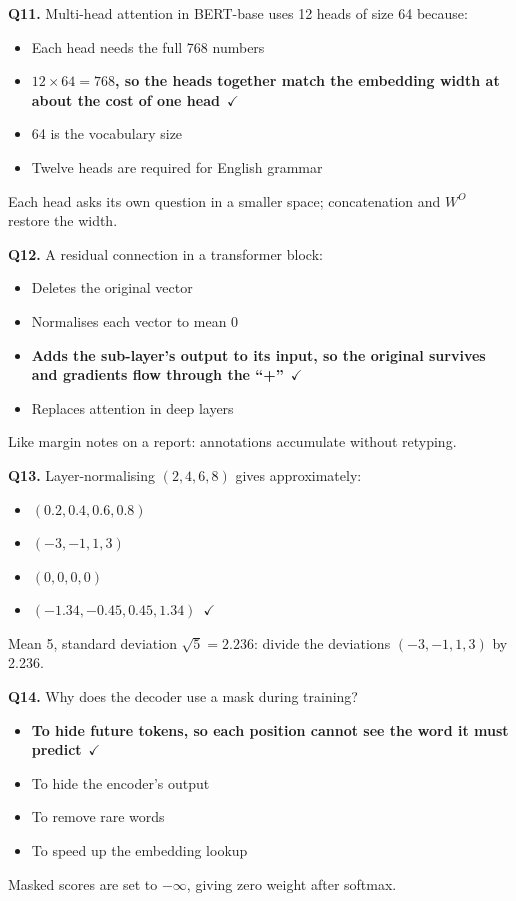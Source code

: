 \documentclass[11pt]{article}
\begin{document}
{\noindent\textbf{Q11.} Multi-head attention in BERT-base uses 12 heads of size 64 because:\begin{itemize}[leftmargin=2.2em,itemsep=0pt,topsep=1pt]\item[A.] Each head needs the full 768 numbers\item[\textbf{B.}] \textbf{$12\times64=768$, so the heads together match the embedding width at about the cost of one head}~{\color{GrnN}$\checkmark$}\item[C.] 64 is the vocabulary size\item[D.] Twelve heads are required for English grammar\end{itemize} Each head asks its own question in a smaller space; concatenation and $W^O$ restore the width.\par\medskip

\noindent\textbf{Q12.} A residual connection in a transformer block:\begin{itemize}[leftmargin=2.2em,itemsep=0pt,topsep=1pt]\item[A.] Deletes the original vector\item[B.] Normalises each vector to mean 0\item[\textbf{C.}] \textbf{Adds the sub-layer's output to its input, so the original survives and gradients flow through the ``+''}~{\color{GrnN}$\checkmark$}\item[D.] Replaces attention in deep layers\end{itemize} Like margin notes on a report: annotations accumulate without retyping.\par\medskip

\noindent\textbf{Q13.} Layer-normalising $(2,4,6,8)$ gives approximately:\begin{itemize}[leftmargin=2.2em,itemsep=0pt,topsep=1pt]\item[A.] $(0.2,0.4,0.6,0.8)$\item[B.] $(-3,-1,1,3)$\item[C.] $(0,0,0,0)$\item[\textbf{D.}] \textbf{$(-1.34,-0.45,0.45,1.34)$}~{\color{GrnN}$\checkmark$}\end{itemize} Mean 5, standard deviation $\sqrt5=2.236$: divide the deviations $(-3,-1,1,3)$ by 2.236.\par\medskip

\noindent\textbf{Q14.} Why does the decoder use a mask during training?\begin{itemize}[leftmargin=2.2em,itemsep=0pt,topsep=1pt]\item[\textbf{A.}] \textbf{To hide future tokens, so each position cannot see the word it must predict}~{\color{GrnN}$\checkmark$}\item[B.] To hide the encoder's output\item[C.] To remove rare words\item[D.] To speed up the embedding lookup\end{itemize} Masked scores are set to $-\infty$, giving zero weight after softmax.\par\medskip

}
\end{document}
